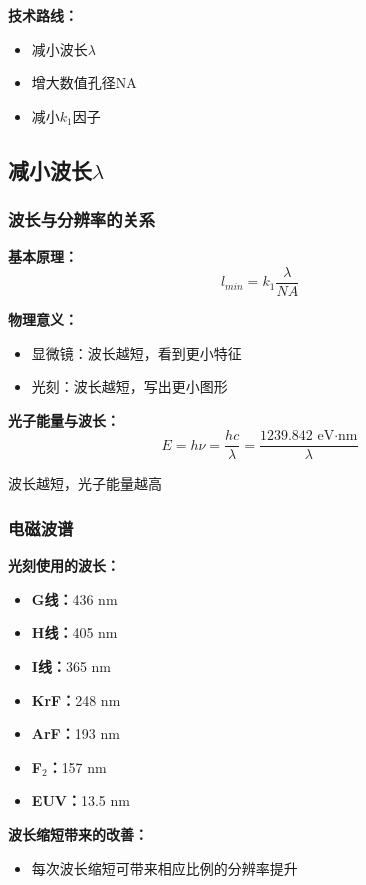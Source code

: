 \documentclass[UTF8,12pt,a4paper]{ctexart}
\begin{document}
\textbf{技术路线：}
\begin{itemize}
    \item 减小波长$\lambda$
    \item 增大数值孔径NA
    \item 减小$k_1$因子
\end{itemize}

\subsection{减小波长$\lambda$}

\subsubsection{波长与分辨率的关系}

\textbf{基本原理：}
\begin{equation}
l_{min} = k_1 \frac{\lambda}{NA}
\end{equation}

\textbf{物理意义：}
\begin{itemize}
    \item 显微镜：波长越短，看到更小特征
    \item 光刻：波长越短，写出更小图形
\end{itemize}

\textbf{光子能量与波长：}
\begin{equation}
E = h\nu = \frac{hc}{\lambda} = \frac{1239.842 \text{ eV·nm}}{\lambda}
\end{equation}

波长越短，光子能量越高

\subsubsection{电磁波谱}

\textbf{光刻使用的波长：}
\begin{itemize}
    \item \textbf{G线：}436 nm
    \item \textbf{H线：}405 nm
    \item \textbf{I线：}365 nm
    \item \textbf{KrF：}248 nm
    \item \textbf{ArF：}193 nm
    \item \textbf{F$_2$：}157 nm
    \item \textbf{EUV：}13.5 nm
\end{itemize}

\textbf{波长缩短带来的改善：}
\begin{itemize}
    \item 每次波长缩短可带来相应比例的分辨率提升
\end{itemize}
\end{document}
